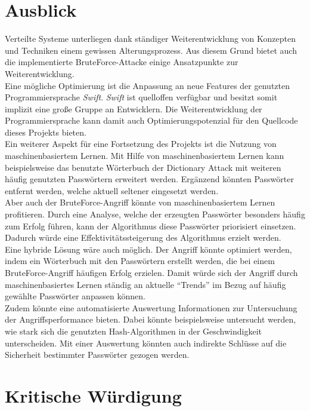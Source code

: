 \section{Ausblick}
\label{ausblick}
Verteilte Systeme unterliegen dank ständiger Weiterentwicklung von Konzepten und Techniken einem gewissen Alterungsprozess. Aus diesem Grund bietet auch die implementierte BruteForce-Attacke einige Ansatzpunkte zur Weiterentwicklung. \\
Eine mögliche Optimierung ist die Anpassung an neue Features der genutzten Programmiersprache \emph{Swift}. \emph{Swift} ist quelloffen verfügbar und besitzt somit implizit eine große Gruppe an Entwicklern. Die Weiterentwicklung der Programmiersprache kann damit auch Optimierungspotenzial für den Quellcode dieses Projekts bieten. \\
Ein weiterer Aspekt für eine Fortsetzung des Projekts ist die Nutzung von maschinenbasiertem Lernen. Mit Hilfe von maschinenbasiertem Lernen kann beispielsweise das benutzte Wörterbuch der Dictionary Attack mit weiteren häufig genutzten Passwörtern erweitert werden. Ergänzend könnten Passwörter entfernt werden, welche aktuell seltener eingesetzt werden.\\
 Aber auch der BruteForce-Angriff könnte von maschinenbasiertem Lernen profitieren. Durch eine Analyse, welche der erzeugten Passwörter besonders häufig zum Erfolg führen, kann der Algorithmus diese Passwörter priorisiert einsetzen. Dadurch würde eine Effektivitätssteigerung des Algorithmus erzielt werden. \\
Eine hybride Lösung wäre auch möglich. Der Angriff könnte optimiert werden, indem ein Wörterbuch mit den Passwörtern erstellt werden, die bei einem BruteForce-Angriff häufigen Erfolg erzielen. Damit würde sich der Angriff durch maschinenbasiertes Lernen ständig an aktuelle \enquote{Trends} im Bezug auf häufig gewählte Passwörter anpassen können. \\
Zudem könnte eine automatisierte Auswertung Informationen zur Untersuchung der Angriffsperformance bieten. Dabei könnte beispielsweise untersucht werden, wie stark sich die genutzten Hash-Algorithmen in der Geschwindigkeit unterscheiden. Mit einer Auswertung könnten auch indirekte Schlüsse auf die Sicherheit bestimmter Passwörter gezogen werden. 

\section{Kritische Würdigung}
\label{kritik}
